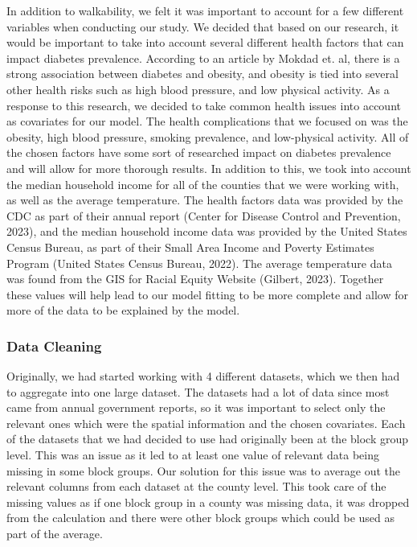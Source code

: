 \documentclass[
]{article}
\begin{document}
In addition to walkability, we felt it was important to account for a
few different variables when conducting our study. We decided that based
on our research, it would be important to take into account several
different health factors that can impact diabetes prevalence. According
to an article by Mokdad et. al, there is a strong association between
diabetes and obesity, and obesity is tied into several other health
risks such as high blood pressure, and low physical activity. As a
response to this research, we decided to take common health issues into
account as covariates for our model. The health complications that we
focused on was the obesity, high blood pressure, smoking prevalence, and
low-physical activity. All of the chosen factors have some sort of
researched impact on diabetes prevalence and will allow for more
thorough results. In addition to this, we took into account the median
household income for all of the counties that we were working with, as
well as the average temperature. The health factors data was provided by
the CDC as part of their annual report (Center for Disease Control and
Prevention, 2023), and the median household income data was provided by
the United States Census Bureau, as part of their Small Area Income and
Poverty Estimates Program (United States Census Bureau, 2022). The
average temperature data was found from the GIS for Racial Equity
Website (Gilbert, 2023). Together these values will help lead to our
model fitting to be more complete and allow for more of the data to be
explained by the model.

\subsubsection{Data Cleaning}\label{data-cleaning}

Originally, we had started working with 4 different datasets, which we
then had to aggregate into one large dataset. The datasets had a lot of
data since most came from annual government reports, so it was important
to select only the relevant ones which were the spatial information and
the chosen covariates. Each of the datasets that we had decided to use
had originally been at the block group level. This was an issue as it
led to at least one value of relevant data being missing in some block
groups. Our solution for this issue was to average out the relevant
columns from each dataset at the county level. This took care of the
missing values as if one block group in a county was missing data, it
was dropped from the calculation and there were other block groups which
could be used as part of the average.
\end{document}
